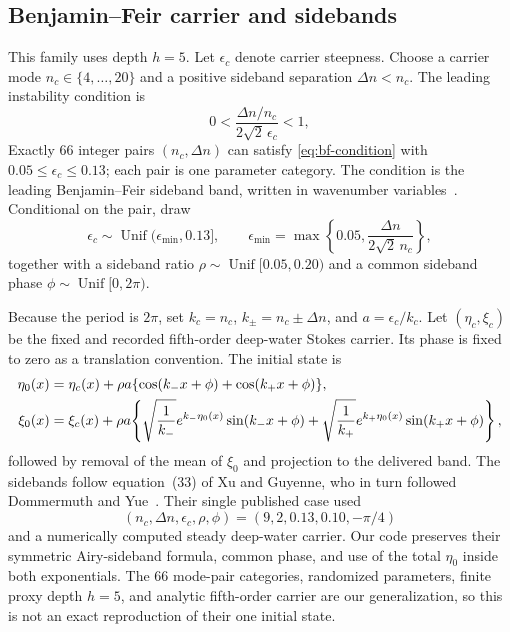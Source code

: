 \documentclass[10pt]{article}
\begin{document}
\subsection{Benjamin--Feir carrier and sidebands}

This family uses depth $h=5$.  Let $\epsilon_c$ denote carrier steepness.
Choose a carrier mode
$n_c\in\{4,\ldots,20\}$ and a positive sideband separation
$\Delta n<n_c$.  The leading instability condition is
\begin{equation}
  0<
  \frac{\Delta n/n_c}{2\sqrt2\,\epsilon_c}
  <1,
  \label{eq:bf-condition}
\end{equation}
Exactly 66 integer pairs $(n_c,\Delta n)$ can satisfy
\eqref{eq:bf-condition} with
$0.05\leq\epsilon_c\leq0.13$; each pair is one parameter category.  The
condition is the leading Benjamin--Feir sideband band, written in wavenumber
variables~\cite{benjaminfeir1967}.
Conditional on the pair, draw
\[
  \epsilon_c\sim\operatorname{Unif}(\epsilon_{\min},0.13],
  \qquad
  \epsilon_{\min}
  =
  \max\!\left\{0.05,
    \frac{\Delta n}{2\sqrt2\,n_c}\right\},
\]
together with a sideband ratio
$\rho\sim\operatorname{Unif}[0.05,0.20)$ and a common sideband phase
$\phi\sim\operatorname{Unif}[0,2\pi)$.

Because the period is $2\pi$, set
$k_c=n_c$, $k_\pm=n_c\pm\Delta n$, and $a=\epsilon_c/k_c$.
Let $(\eta_c,\xi_c)$ be the fixed and recorded fifth-order deep-water Stokes
carrier.
Its phase is fixed to zero as a translation convention.
The initial state is
\begin{align}
  \eta_0(x)
    &=
    \eta_c(x)
    +\rho a\{\cos(k_-x+\phi)+\cos(k_+x+\phi)\}, \notag\\
  \xi_0(x)
    &=
    \xi_c(x)
    +\rho a\!\left\{
      \sqrt{\frac1{k_-}}e^{k_-\eta_0(x)}\sin(k_-x+\phi)
      +
      \sqrt{\frac1{k_+}}e^{k_+\eta_0(x)}\sin(k_+x+\phi)
    \right\},
  \label{eq:bf-state}
\end{align}
followed by removal of the mean of $\xi_0$ and projection to the delivered
band.  The sidebands follow equation~(33) of Xu and Guyenne, who in turn
followed Dommermuth and Yue~\cite{xu2009,dommermuth1987}.  Their single
published case used
\[
  (n_c,\Delta n,\epsilon_c,\rho,\phi)
  =(9,2,0.13,0.10,-\pi/4)
\]
and a numerically computed steady deep-water carrier.  Our code preserves
their symmetric Airy-sideband formula, common phase, and use of the total
$\eta_0$ inside both exponentials.  The 66 mode-pair categories, randomized
parameters, finite proxy depth $h=5$, and analytic fifth-order carrier are
our generalization, so this is not an exact reproduction of their one initial
state.
\end{document}
